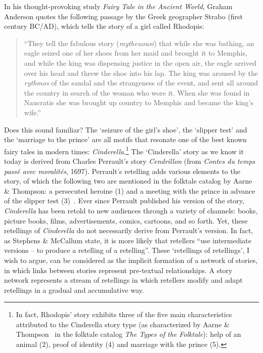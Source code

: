 In his thought-provoking study \emph{Fairy Tale in the Ancient World}, Graham Anderson quotes the following passage by the Greek geographer Strabo (first century BC/AD), which tells the story of a girl called Rhodopis:
\begin{quote}
  ``They tell the fabulous story (\emph{mytheuousi}) that while she was bathing, an eagle seized one of her shoes from her maid and brought it to Memphis, and while the king was dispensing justice in the open air, the eagle arrived over his head and threw the shoe into his lap. The king was aroused by the \emph{rythmos} of the sandal and the strangeness of the event, and sent all around the country in search of the woman who wore it. When she was found in Naucratis she was brought up country to Memphis and became the king's wife.''~\autocite{Anderson:2000}
\end{quote}
Does this sound familiar? The `seizure of the girl's shoe', the `slipper test' and the `marriage to the prince' are all motifs that resonate one of the best known fairy tales in modern times: \emph{Cinderella}.\footnote{In fact, Rhodopis' story exhibits three of the five main characteristics attributed to the Cinderella story type (as characterized by Aarne \& Thompson~\autocite{aarne:1961} in the folktale catalog \emph{The Types of the Folktale}): help of an animal (2), proof of identity (4) and marriage with the prince (5).} The `Cinderella' story as we know it today is derived from Charles Perrault's story \emph{Cendrillon} (from \emph{Contes du temps passé avec moralités}, 1697). Perrault's retelling adds various elements to the story, of which the following two are mentioned in the folktale catalog by Aarne \& Thompson: a persecuted heroine (1) and a meeting with the prince in advance of the slipper test (3)~\autocite{aarne:1961}. Ever since Perrault published his version of the story, \emph{Cinderella}\/ has been retold to new audiences through a variety of channels: books, picture books, films, advertisements, comics, cartoons, and so forth. Yet, these retellings of \emph{Cinderella}\/ do not necessarily derive from Perrault's version. In fact, as Stephens \& McCallum state, it is more likely that retellers ``use intermediate versions -- to produce a retelling of a retelling''\autocite{stephens_mccallum}. These `retellings of retellings', I wish to argue, can be considered as the implicit formation of a network of stories, in which links between stories represent pre-textual relationships\autocite[In evolutionary terms, such networks can be described as lineages or phylogenetic trees. I prefer to use the term network, however, because it does not presume a clear `root node' from which all subsequent story versions have supposedly sprang. Cf.][]{mesoudi:2011, tehrani:2013}. A story network represents a stream of retellings in which retellers modify and adapt retellings in a gradual and accumulative way.


